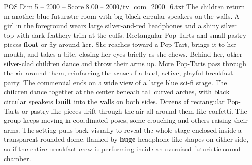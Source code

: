 \begin{textsample}{POS Dim 5 – 2000 – Score 8.00 – 2000/tv\_com\_2000\_6.txt}
The children return in another blue futuristic room with big black circular speakers on the walls.
A girl in the foreground wears large silver-and-red headphones and a shiny silver top with dark feathery trim at the cuffs.
Rectangular Pop-Tarts and small pastry pieces \textbf{float} or fly around her.
She reaches toward a Pop-Tart, brings it to her mouth, and takes a bite, closing her eyes briefly as she chews.
Behind her, other silver-clad children dance and throw their arms up.
More Pop-Tarts pass through the air around them, reinforcing the sense of a loud, active, playful breakfast party.
The commercial ends on a wide view of a large blue sci-fi stage.
The children dance together at the center beneath tall curved arches, with black circular speakers \textbf{built} into the walls on both sides.
Dozens of rectangular Pop-Tarts or pastry-like pieces drift through the air all around them like confetti.
The group keeps moving in coordinated poses, some crouching and others raising their arms.
The setting pulls back visually to reveal the whole stage enclosed inside a transparent rounded dome, flanked by \textbf{huge} headphone-like shapes on either side, as if the entire breakfast crew is performing inside an oversized futuristic sound chamber.

\end{textsample}
